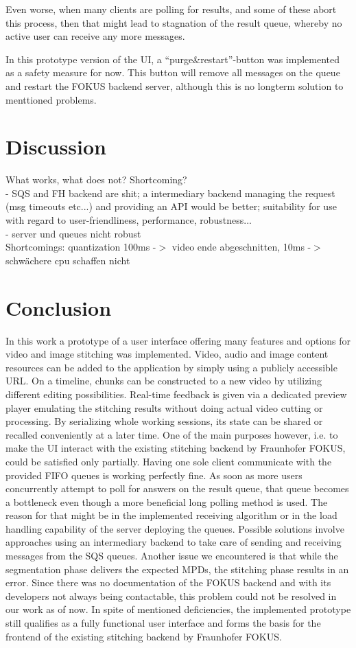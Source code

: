 \documentclass[conference]{IEEEtran}
\begin{document}
Even worse, when many clients are polling for results, and some of these abort this process, then that might lead to stagnation of the result queue, whereby no active user can receive any more messages.

In this prototype version of the UI, a ``purge\&restart''-button was implemented as a safety measure for now.
This button will remove all messages on the queue and restart the FOKUS backend server, although this is no longterm solution to menttioned problems.

\section{Discussion}
What works, what does not? Shortcoming?\\

- SQS and FH backend are shit; a intermediary backend managing the request (msg timeouts etc...) and providing an API would be better; suitability for use with regard to user-friendliness, performance, robustness... \\
- server und queues nicht robust \\
Shortcomings: quantization 100ms -$>$ video ende abgeschnitten, 10ms -$>$ schwächere cpu schaffen nicht\\

\section{Conclusion}
In this work a prototype of a user interface offering many features and options for video and image stitching was implemented.
Video, audio and image content resources can be added to the application by simply using a publicly accessible URL.
On a timeline, chunks can be constructed to a new video by utilizing different editing possibilities.
Real-time feedback is given via a dedicated preview player emulating the stitching results without doing actual video cutting or processing.
By serializing whole working sessions, its state can be shared or recalled conveniently at a later time.
One of the main purposes however, i.e. to make the UI interact with the existing stitching backend by Fraunhofer FOKUS, could be satisfied only partially.
Having one sole client communicate with the provided FIFO queues is working perfectly fine.
As soon as more users concurrently attempt to poll for answers on the result queue, that queue becomes a bottleneck even though a more beneficial long polling method is used.
The reason for that might be in the implemented receiving algorithm or in the load handling capability of the server deploying the queues.
Possible solutions involve approaches using an intermediary backend to take care of sending and receiving messages from the SQS queues.
Another issue we encountered is that while the segmentation phase delivers the expected MPDs, the stitching phase results in an error.
Since there was no documentation of the FOKUS backend and with its developers not always being contactable, this problem could not be resolved in our work as of now.
In spite of mentioned deficiencies, the implemented prototype still qualifies as a fully functional user interface and forms the basis for the frontend of the existing stitching backend by Fraunhofer FOKUS.
\end{document}

